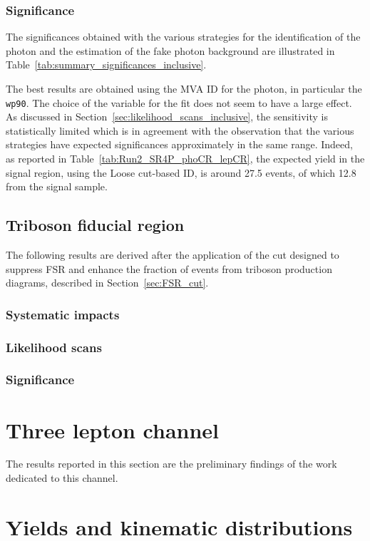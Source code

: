 \subsubsection{Significance}
The significances obtained with the various strategies for the identification of the photon and the estimation of the fake photon background are illustrated in Table~\ref{tab:summary_significances_inclusive}.


The best results are obtained using the MVA ID for the photon, in particular the \texttt{wp90}.
The choice of the variable for the fit does not seem to have a large effect.
As discussed in Section~\ref{sec:likelihood_scans_inclusive}, the sensitivity is statistically limited
which is in agreement with the observation that the various strategies have expected significances approximately in the same range.
Indeed, as reported in Table~\ref{tab:Run2_SR4P_phoCR_lepCR}, the expected yield in the signal region, using the Loose cut-based ID,
is around 27.5 events, of which 12.8 from the signal sample.

\subsection{Triboson fiducial region}
\label{sec:results_4L_FSRcut}
The following results are derived after the application of the cut
designed to suppress FSR and enhance the fraction of events from triboson production diagrams,
described in Section~\ref{sec:FSR_cut}.

\subsubsection{Systematic impacts}


\subsubsection{Likelihood scans}


\subsubsection{Significance}


\section{Three lepton channel}
\label{sec:results_3L}
The results reported in this section are the preliminary findings
of the work dedicated to this channel.

\section{Yields and kinematic distributions}

